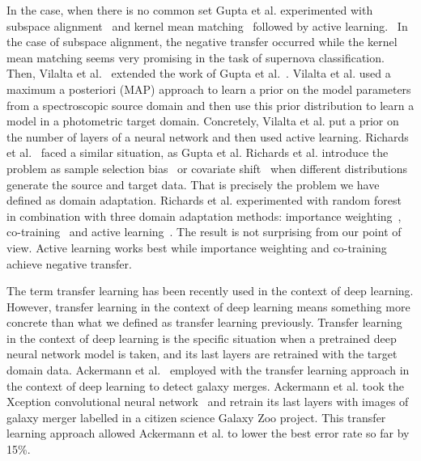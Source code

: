 In the case, when there is no common set Gupta et al. experimented with subspace alignment~\cite{fernando2014} and kernel mean matching~\cite{gretton2009} followed by active learning.~\cite{gupta2016}
In the case of subspace alignment, the negative transfer occurred while the kernel mean matching seems very promising in the task of supernova classification.
Then, Vilalta et al.~\cite{vilalta2018} extended the work of Gupta et al.~\cite{gupta2016}.
Vilalta et al. used a maximum a posteriori (MAP) approach to learn a prior on the model parameters from a spectroscopic source domain
and then use this prior distribution to learn a model in a photometric target domain.
Concretely, Vilalta et al. put a prior on the number of layers of a neural network
and then used active learning.
Richards et al.~\cite{richards2011} faced a similar situation, as Gupta et al.
Richards et al. introduce the problem as sample selection bias~\cite{shimodaira2000} or covariate shift~\cite{heckman1979}
when different distributions generate the source and target data.
That is precisely the problem we have defined as domain adaptation.
Richards et al. experimented with random forest in combination with three domain adaptation methods:
importance weighting~\cite{shimodaira2000}, co-training~\cite{blum1998} and active learning~\cite{settles2009}.
The result is not surprising from our point of view.
Active learning works best while importance weighting and co-training achieve negative transfer.

The term transfer learning has been recently used in the context of deep learning.
However, transfer learning in the context of deep learning means something more concrete than what we defined as transfer learning previously.
Transfer learning in the context of deep learning is the specific situation
when a pretrained deep neural network model is taken,
and its last layers are retrained with the target domain data.
Ackermann et al.~\cite{ackermann2018} employed with the transfer learning approach in the context of deep learning to detect galaxy merges.
Ackermann et al. took the Xception convolutional neural network~\cite{chollet2017}
and retrain its last layers with images of galaxy merger labelled in a citizen science Galaxy Zoo project.
This transfer learning approach allowed Ackermann et al. to lower the best error rate so far by 15\%.

